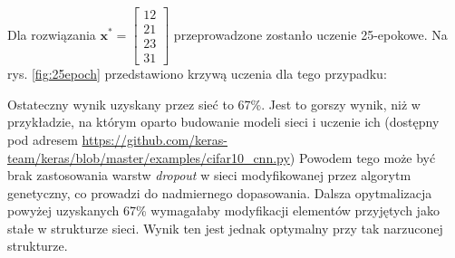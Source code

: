 Dla rozwiązania $\mathbf{x^*} = \begin{bmatrix}12 \\ 21 \\ 23 \\ 31\end{bmatrix}$ przeprowadzone zostanło uczenie 25-epokowe.
Na rys. \ref{fig:25epoch} przedstawiono krzywą uczenia dla tego przypadku:

Ostateczny wynik uzyskany przez sieć to 67\%.
Jest to gorszy wynik, niż w przykładzie, na którym oparto budowanie modeli sieci i uczenie ich (dostępny pod adresem \url{https://github.com/keras-team/keras/blob/master/examples/cifar10_cnn.py})
Powodem tego może być brak zastosowania warstw \textit{dropout} w sieci modyfikowanej przez algorytm genetyczny, co prowadzi do nadmiernego dopasowania.
Dalsza opytmalizacja powyżej uzyskanych 67\% wymagałaby modyfikacji elementów przyjętych jako stałe w strukturze sieci.
Wynik ten jest jednak optymalny przy tak narzuconej strukturze.

